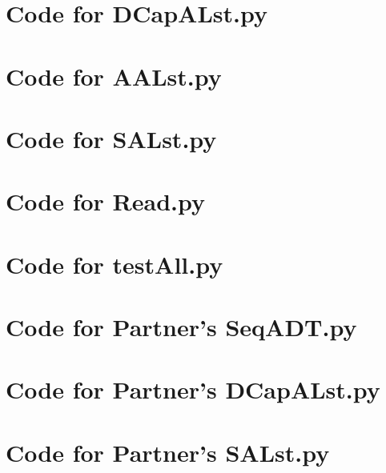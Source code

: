 \documentclass[12pt]{article}
\begin{document}
\newpage

\section{Code for DCapALst.py}

\noindent 

\newpage

\section{Code for AALst.py}

\noindent 

\newpage

\section{Code for SALst.py}

\noindent 

\newpage

\section{Code for Read.py}

\noindent 

\newpage

\section{Code for testAll.py}

\noindent 

\newpage

\section{Code for Partner's SeqADT.py}

\noindent 

\newpage

\section{Code for Partner's DCapALst.py}

\noindent 

\newpage

\section{Code for Partner's SALst.py}

\noindent 
\end{document}
